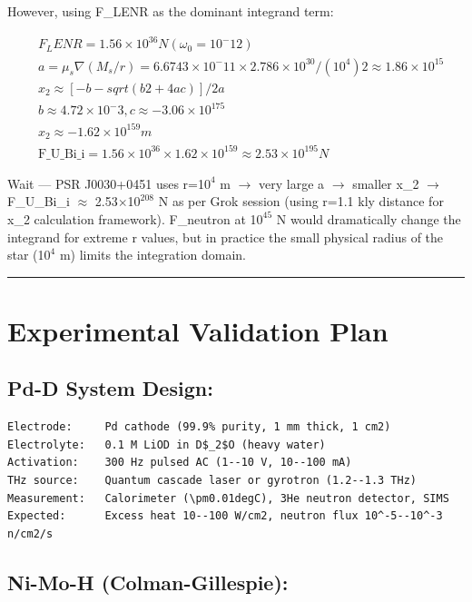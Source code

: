 \documentclass[12pt,a4paper]{article}
\begin{document}
However, using F\_LENR as the dominant integrand term:

\begin{equation}
\begin{aligned}
  & F_LENR = 1.56 \times 10^36 N  (\omega_0=10^-12) \\
  & a = \mu_s\nabla(M_s/r) = 6.6743\times10^-11 \times 2.786\times10^30 / (10^4)2 \approx 1.86 \times 10^15 \\
  & x_2 \approx [-b - sqrt(b2 + 4ac)] / 2a \\
  & b \approx 4.72\times10^-3, c \approx -3.06\times10^175 \\
  & x_2 \approx -1.62 \times 10^159 m \\
  & \text{F\_U\_Bi\_i} = 1.56\times10^36 \times 1.62\times10^159 \approx 2.53 \times 10^195 N
\end{aligned}
\end{equation}

Wait --- PSR J0030+0451 uses r=1$0^{4}$ m $\to$ very large a $\to$ smaller x\_2 $\to$ F\_{U\_Bi\_i} $\approx$ 2.53$\times$1$0^{208}$ N as per Grok session (using r=1.1 kly distance for x\_2 calculation framework). F\_neutron at 1$0^{45}$ N would dramatically change the integrand for extreme r values, but in practice the small physical radius of the star (1$0^{4}$ m) limits the integration domain.

\medskip\hrule\medskip

\section{Experimental Validation Plan}

\subsection{Pd-D System Design:}

\begin{verbatim}
Electrode:     Pd cathode (99.9% purity, 1 mm thick, 1 cm2)
Electrolyte:   0.1 M LiOD in D$_2$O (heavy water)
Activation:    300 Hz pulsed AC (1--10 V, 10--100 mA)
THz source:    Quantum cascade laser or gyrotron (1.2--1.3 THz)
Measurement:   Calorimeter (\pm0.01degC), 3He neutron detector, SIMS
Expected:      Excess heat 10--100 W/cm2, neutron flux 10^-5--10^-3 n/cm2/s
\end{verbatim}

\subsection{Ni-Mo-H (Colman-Gillespie):}
\end{document}
